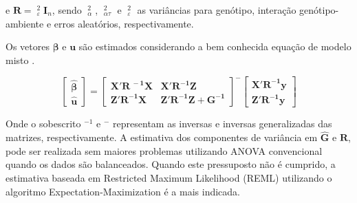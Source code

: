 \documentclass[
]{book}
\begin{document}
e \({\boldsymbol{R}} = \mathop {\hat \sigma }\nolimits_\varepsilon ^2 {{\boldsymbol{I}}_n}\), sendo \(\mathop {\hat \sigma }\nolimits_\alpha ^2\), \(\mathop {\hat \sigma }\nolimits_{\alpha \tau }^2\) e \(\mathop {\hat \sigma }\nolimits_\varepsilon ^2\) as variâncias para genótipo, interação genótipo-ambiente e erros aleatórios, respectivamente.

Os vetores \({\boldsymbol{\beta }}\) e \(\boldsymbol{u}\) são estimados considerando a bem conhecida equação de modelo misto \citet{Henderson1975}.

\[ \label{ad}
\left[ {\begin{array}{*{20}{c}}{{\boldsymbol{\hat \beta }}}\\{{\boldsymbol{\hat u}}}\end{array}} \right]{\boldsymbol{ = }}{\left[ {\begin{array}{*{20}{c}}{{\boldsymbol{X'}}{{\boldsymbol{R}}^{\ - {\boldsymbol{1}}}}{\boldsymbol{X}}}&{{\boldsymbol{X'}}{{\boldsymbol{R}}^{ - {\boldsymbol{1}}}}{\boldsymbol{Z}}}\\{{\boldsymbol{Z'}}{{\boldsymbol{R}}^{ - {\boldsymbol{1}}}}{\boldsymbol{X}}}&{{\boldsymbol{Z'}}{{\boldsymbol{R}}^{ - {\boldsymbol{1}}}}{\boldsymbol{Z + }}{{\boldsymbol{G}}^{ - {\boldsymbol{1}}}}}\end{array}} \right]^ - }\left[ {\begin{array}{*{20}{c}}{{\boldsymbol{X'}}{{\boldsymbol{R}}^{ - {\boldsymbol{1}}}}{\boldsymbol{y}}}\\{{\boldsymbol{Z'}}{{\boldsymbol{R}}^{ - {\boldsymbol{1}}}}{\boldsymbol{y}}}\end{array}} \right]
\]

Onde o sobescrito \(^{-1}\) e \(^-\) representam as inversas e inversas generalizadas das matrizes, respectivamente. A estimativa dos componentes de variância em \({\boldsymbol{\hat G}}\) e \({\boldsymbol{\hat R}}\), pode ser realizada sem maiores problemas utilizando ANOVA  convencional quando os dados são balanceados. Quando este pressuposto não é cumprido, a estimativa baseada em Restricted Maximum Likelihood (REML)  utilizando o algoritmo Expectation-Maximization \citep{Dempster1977} é a mais indicada.
\end{document}
